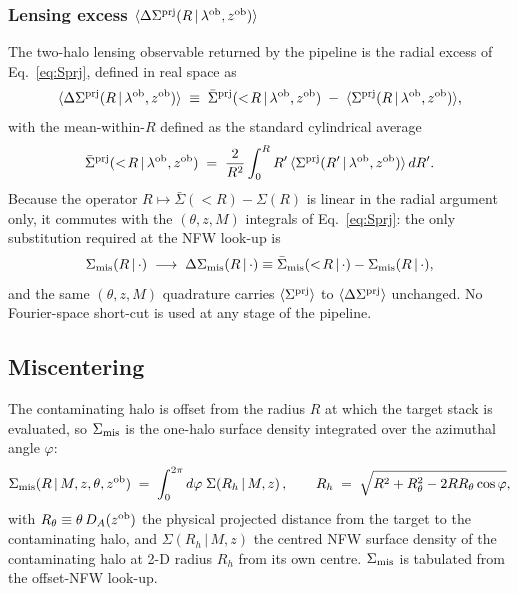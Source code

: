 \documentclass[a4paper, 11pt]{article}
\newcommand{\lob}{\lambda^{\rm ob}}
\newcommand{\zob}{z^{\rm ob}}
\newcommand{\Sprj}{\Sigma^{\rm prj}}
\newcommand{\Smis}{\Sigma_{\rm mis}}
\newcommand{\DSprj}{\Delta\Sigma^{\rm prj}}
\newcommand{\DSmis}{\Delta\Sigma_{\rm mis}}
\newcommand{\avg}[1]{\langle #1 \rangle}
\begin{document}
\subsubsection{Lensing excess \texorpdfstring{$\avg{\DSprj(R\,|\,\lob,\zob)}$}{DSprj(R|lob,zob)}}

The two-halo lensing observable returned by the pipeline is the radial
excess of Eq.~\eqref{eq:Sprj}, defined in real space as
\begin{equation}
\avg{\DSprj(R\,|\,\lob,\zob)} \;\equiv\;
\bar\Sigma^{\rm prj}(<\!R\,|\,\lob,\zob)
\;-\;
\avg{\Sprj(R\,|\,\lob,\zob)} ,
\label{eq:DSprj_def}
\end{equation}
with the mean-within-$R$ defined as the standard cylindrical average
\begin{equation}
\bar\Sigma^{\rm prj}(<\!R\,|\,\lob,\zob) \;=\;
\frac{2}{R^{2}}\int_{0}^{R} R'\,\avg{\Sprj(R'\,|\,\lob,\zob)}\,dR' .
\label{eq:Sbar}
\end{equation}
Because the operator $R\mapsto\bar\Sigma(<\!R)-\Sigma(R)$ is linear in
the radial argument only, it commutes with the $(\theta,z,M)$ integrals
of Eq.~\eqref{eq:Sprj}: the only substitution required at the NFW
look-up is
\begin{equation}
\Smis(R\,|\,\cdot)\;\longrightarrow\;
\DSmis(R\,|\,\cdot)\equiv \bar\Smis(<\!R\,|\,\cdot)-\Smis(R\,|\,\cdot) ,
\label{eq:DSmis_swap}
\end{equation}
and the same $(\theta,z,M)$ quadrature carries
$\avg{\Sprj}$ to $\avg{\DSprj}$ unchanged.  No Fourier-space short-cut
is used at any stage of the pipeline.

\subsection{Miscentering}
\label{sec:miscentering}

The contaminating halo is offset from the radius $R$ at which the
target stack is evaluated, so $\Smis$ is the one-halo surface density
integrated over the azimuthal angle $\varphi$:
\begin{equation}
\Smis(R\,|\,M,z,\theta,\zob) \;=\;
\int_{0}^{2\pi} d\varphi\;\Sigma\!\left(R_h\,|\,M,z\right) ,
\qquad
R_h \;=\; \sqrt{R^{2}+R_\theta^{2}-2 R R_\theta\cos\varphi} ,
\label{eq:Smis}
\end{equation}
with $R_\theta\equiv\theta\,D_A(\zob)$ the physical projected
distance from the target to the contaminating halo, and
$\Sigma(R_h\,|\,M,z)$ the centred NFW surface density of the
contaminating halo at 2-D radius $R_h$ from its own centre.  $\Smis$
is tabulated from the offset-NFW look-up.
\end{document}
